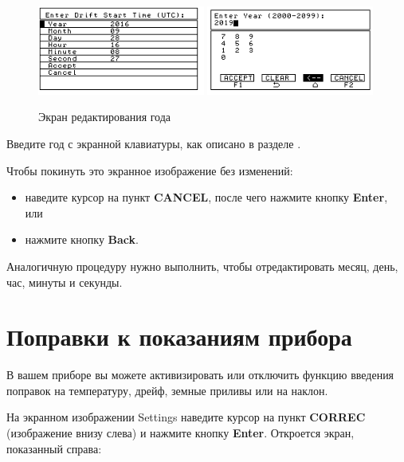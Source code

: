 \begin{figure}[H]
  \centering
  \includegraphics[width=0.49\textwidth]{figures/the_year_editing_screen_1}
  \includegraphics[width=0.49\textwidth]{figures/the_year_editing_screen_2}
  \caption{Экран редактирования года}
  \label{fig:the_year_editing_screen_1}
\end{figure}

Введите год с экранной клавиатуры, как описано в разделе
.

Чтобы покинуть это экранное изображение без изменений:
\begin{itemize}
  \item наведите курсор на пункт \textbf{CANCEL}, после чего нажмите кнопку
    \textbf{Enter}, или

  \item нажмите кнопку \textbf{Back}.
\end{itemize}

Аналогичную процедуру нужно выполнить, чтобы отредактировать месяц, день, час,
минуты и секунды.

\section{Поправки к показаниям прибора}

В вашем приборе \cg{} вы можете активизировать или отключить функцию введения
поправок на температуру, дрейф, земные приливы или на наклон.

На экранном изображении Settings наведите курсор на пункт \textbf{CORREC}
(изображение внизу слева) и нажмите кнопку \textbf{Enter}. Откроется экран,
показанный справа:


